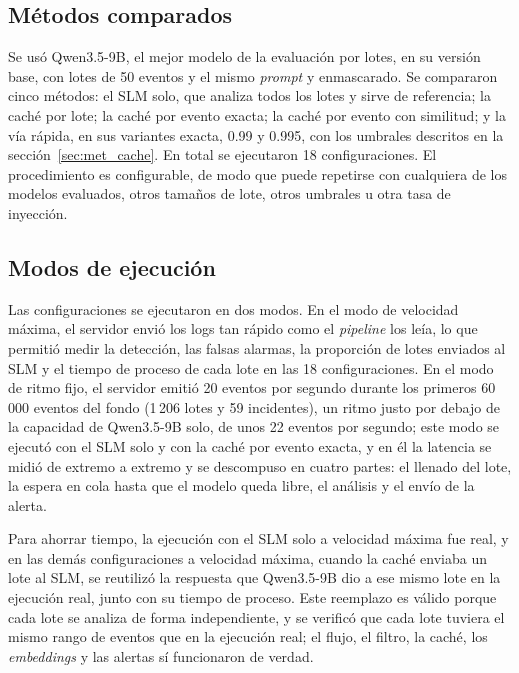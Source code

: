 \subsection{Métodos comparados}

Se usó Qwen3.5-9B, el mejor modelo de la evaluación por lotes, en su versión base, con lotes de 50 eventos y el mismo \textit{prompt} y enmascarado. Se compararon cinco métodos: el SLM solo, que analiza todos los lotes y sirve de referencia; la caché por lote; la caché por evento exacta; la caché por evento con similitud; y la vía rápida, en sus variantes exacta, 0.99 y 0.995, con los umbrales descritos en la sección~\ref{sec:met_cache}. En total se ejecutaron 18 configuraciones. El procedimiento es configurable, de modo que puede repetirse con cualquiera de los modelos evaluados, otros tamaños de lote, otros umbrales u otra tasa de inyección.

\subsection{Modos de ejecución}

Las configuraciones se ejecutaron en dos modos. En el modo de velocidad máxima, el servidor envió los logs tan rápido como el \textit{pipeline} los leía, lo que permitió medir la detección, las falsas alarmas, la proporción de lotes enviados al SLM y el tiempo de proceso de cada lote en las 18 configuraciones. En el modo de ritmo fijo, el servidor emitió 20 eventos por segundo durante los primeros 60\,000 eventos del fondo (1\,206 lotes y 59 incidentes), un ritmo justo por debajo de la capacidad de Qwen3.5-9B solo, de unos 22 eventos por segundo; este modo se ejecutó con el SLM solo y con la caché por evento exacta, y en él la latencia se midió de extremo a extremo y se descompuso en cuatro partes: el llenado del lote, la espera en cola hasta que el modelo queda libre, el análisis y el envío de la alerta.

Para ahorrar tiempo, la ejecución con el SLM solo a velocidad máxima fue real, y en las demás configuraciones a velocidad máxima, cuando la caché enviaba un lote al SLM, se reutilizó la respuesta que Qwen3.5-9B dio a ese mismo lote en la ejecución real, junto con su tiempo de proceso. Este reemplazo es válido porque cada lote se analiza de forma independiente, y se verificó que cada lote tuviera el mismo rango de eventos que en la ejecución real; el flujo, el filtro, la caché, los \textit{embeddings} y las alertas sí funcionaron de verdad.

